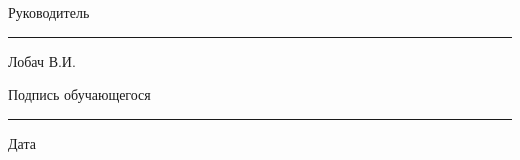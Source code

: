\documentclass[a4papper,11pt]{report}
\begin{document}
\begin{enumerate}
    \end{enumerate}


    Руководитель \rule{6cm}{0.4pt} Лобач В.И.

    Подпись обучающегося \rule{6cm}{0.4pt}

    Дата
\end{document}
